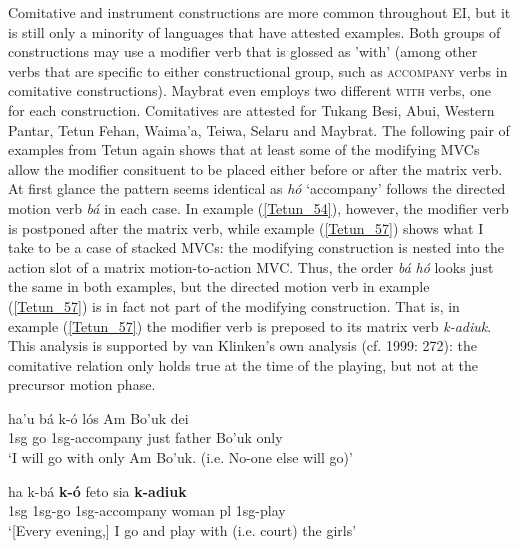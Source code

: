 Comitative and instrument constructions are more common throughout EI, but it is still only a minority of languages that have attested examples. Both groups of constructions may use a modifier verb that is glossed as 'with' (among other verbs that are specific to either constructional group, such as \textsc{accompany} verbs in comitative constructions). Maybrat even employs two different \textsc{with} verbs, one for each construction. Comitatives are attested for Tukang Besi, Abui, Western Pantar, Tetun Fehan, Waima'a, Teiwa, Selaru and Maybrat. The following pair of examples from Tetun again shows that at least some of the modifying MVCs allow the modifier consituent to be placed either before or after the matrix verb. At first glance the pattern seems identical as \textit{hó} `accompany' follows the directed motion verb \textit{bá} in each case. In example (\ref{Tetun_54}), however, the modifier verb is postponed after the matrix verb, while example (\ref{Tetun_57}) shows what I take to be a case of stacked MVCs: the modifying construction is nested into the action slot of a matrix motion-to-action MVC. Thus, the order \textit{bá} \textit{hó} looks just the same in both examples, but the directed motion verb in example (\ref{Tetun_57}) is in fact not part of the modifying construction. That is, in example (\ref{Tetun_57}) the modifier verb is preposed to its matrix verb \textit{k-adiuk}. This analysis is supported by van Klinken's own analysis (cf. 1999: 272): the comitative relation only holds true at the time of the playing, but not at the precursor motion phase.

\ea \label{Tetun_54}
\gll ha'u bá k-ó lós Am Bo'uk dei \\
1\acs{sg} go 1\acs{sg}-accompany just father Bo'uk only \\
\glft `I will go with only Am Bo'uk. (i.e. No-one else will go)' \\ 
\z
\xe

\ea \label{Tetun_57}
\gll ha k-bá \textbf{k-ó} feto sia \textbf{k-adiuk} \\
1\acs{sg} 1\acs{sg}-go 1\acs{sg}-accompany woman \acs{pl} 1\acs{sg}-play \\
\glft `[Every evening,] I go and play with (i.e. court) the girls' \\ 
\z
\xe

